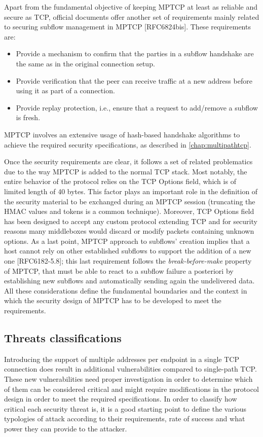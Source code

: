 Apart from the fundamental objective of keeping MPTCP at least as reliable and secure as TCP, official documents offer another set of requirements mainly related to securing subflow management in MPTCP [RFC6824bis]. These requirements are:
\begin{itemize} 
\item Provide a mechanism to confirm that the parties in a subflow handshake are the same as in the original connection setup.

\item Provide verification that the peer can receive traffic at a new address before using it as part of a connection.

\item Provide replay protection, i.e., ensure that a request to add/remove a subflow is fresh.
\end{itemize}

MPTCP involves an extensive usage of hash-based handshake algorithms to achieve the required security specifications, as described in \autoref{chap:multipathtcp}. 


Once the security requirements are clear, it follows a set of related problematics due to the way MPTCP is added to the normal TCP stack. Most notably, the entire behavior of the protocol relies on the TCP Options field, which is of limited length of 40 bytes. This factor plays an important role in the definition of the security material to be exchanged during an MPTCP session (truncating the HMAC values and tokens is a common technique). Moreover, TCP Options field has been designed to accept any custom protocol extending TCP and for security reasons many middleboxes would discard or modify packets containing unknown options. As a last point, MPTCP approach to subflows' creation implies that a host cannot rely on other established subflows to support the addition of a new one [RFC6182-5.8]; this last requirement follows the \textit{break-before-make} property of MPTCP, that must be able to react to a subflow failure a posteriori by establishing new subflows and automatically sending again the undelivered data. All these considerations define the fundamental boundaries and the context in which the security design of MPTCP has to be developed to meet the requirements.

\subsection{Threats classifications}
Introducing the support of multiple addresses per endpoint in a single TCP connection does result in additional vulnerabilities compared to single-path TCP. These new vulnerabilities need proper investigation in order to determine which of them can be considered critical and might require modifications in the protocol design in order to meet the required specifications. In order to classify how critical each security threat is, it is a good starting point to define the various typologies of attack according to their requirements, rate of success and what power they can provide to the attacker.

